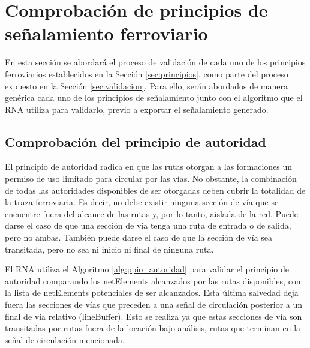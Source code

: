 \section{Comprobación de principios de señalamiento ferroviario}
	\label{sec:validar_principios}
	
				
	En esta sección se abordará el proceso de validación de cada uno de los principios ferroviarios establecidos en la Sección \ref{sec:principios}, como parte del proceso expuesto en la Sección \ref{sec:validacion}. Para ello, serán abordados de manera genérica cada uno de los principios de señalamiento junto con el algoritmo que el RNA utiliza para validarlo, previo a exportar el señalamiento generado.
	
	\subsection{Comprobación del principio de autoridad}
		
		El principio de autoridad radica en que las rutas otorgan a las formaciones un permiso de uso limitado para circular por las vías. No obstante, la combinación de todas las autoridades disponibles de ser otorgadas deben cubrir la totalidad de la traza ferroviaria. Es decir, no debe existir ninguna sección de vía que se encuentre fuera del alcance de las rutas y, por lo tanto, aislada de la red. Puede darse el caso de que una sección de vía tenga una ruta de entrada o de salida, pero no ambas. También puede darse el caso de que la sección de vía sea transitada, pero no sea ni inicio ni final de ninguna ruta.
		
		El RNA utiliza el Algoritmo \ref{alg:ppio_autoridad} para validar el principio de autoridad comparando los netElements alcanzados por las rutas disponibles, con la lista de netElements potenciales de ser alcanzados. Esta última salvedad deja fuera las secciones de vías que preceden a una señal de circulación posterior a un final de vía relativo (lineBuffer). Esto se realiza ya que estas secciones de vía son transitadas por rutas fuera de la locación bajo análisis, rutas que terminan en la señal de circulación mencionada.

